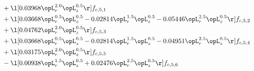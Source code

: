\begin{alignat}{2}
& + \l[  0.03968 \opL_r^{2.0} \opL_z^{0.5}  \r] f_{c,5,1} \nonumber \\ 
& + \l[  0.03668 \opL_r^{0.5} \opL_z^{0.5}   -0.02814 \opL_r^{1.5} \opL_z^{0.5}   -0.05446 \opL_r^{2.5} \opL_z^{0.5}  \r] f_{c,5,2} \nonumber \\ 
& + \l[  0.04762 \opL_r^{2.0} \opL_z^{0.5}  \r] f_{c,5,3} \nonumber \\ 
& + \l[  0.03668 \opL_r^{0.5} \opL_z^{0.5}   -0.02814 \opL_r^{1.5} \opL_z^{0.5}   -0.04951 \opL_r^{2.5} \opL_z^{0.5}  \r] f_{c,5,4} \nonumber \\ 
& + \l[  0.03175 \opL_r^{2.0} \opL_z^{0.5}  \r] f_{c,5,5} \nonumber \\ 
& - \l[  0.00938 \opL_r^{1.5} \opL_z^{0.5} +  0.02476 \opL_r^{2.5} \opL_z^{0.5}  \r] f_{c,5,6} \nonumber \\ 
\end{alignat} 



